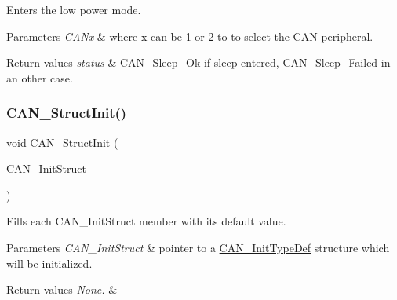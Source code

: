 Enters the low power mode. 


\begin{DoxyParams}{Parameters}
{\em C\+A\+Nx} & where x can be 1 or 2 to to select the C\+AN peripheral. \\
\hline
\end{DoxyParams}

\begin{DoxyRetVals}{Return values}
{\em status} & C\+A\+N\+\_\+\+Sleep\+\_\+\+Ok if sleep entered, C\+A\+N\+\_\+\+Sleep\+\_\+\+Failed in an other case. \\
\hline
\end{DoxyRetVals}
\mbox{\label{group___c_a_n___private___functions_gad77ad810868ed111755fc9e8ae0c7646}} 
\subsubsection{\texorpdfstring{CAN\_StructInit()}{CAN\_StructInit()}}
{\footnotesize\ttfamily void C\+A\+N\+\_\+\+Struct\+Init (\begin{DoxyParamCaption}\item[{\mbox{\hyperlink{struct_c_a_n___init_type_def}{C\+A\+N\+\_\+\+Init\+Type\+Def}} $\ast$}]{C\+A\+N\+\_\+\+Init\+Struct }\end{DoxyParamCaption})}



Fills each C\+A\+N\+\_\+\+Init\+Struct member with its default value. 


\begin{DoxyParams}{Parameters}
{\em C\+A\+N\+\_\+\+Init\+Struct} & pointer to a \mbox{\hyperlink{struct_c_a_n___init_type_def}{C\+A\+N\+\_\+\+Init\+Type\+Def}} structure which will be initialized. \\
\hline
\end{DoxyParams}

\begin{DoxyRetVals}{Return values}
{\em None.} & \\
\hline
\end{DoxyRetVals}
\mbox{\label{group___c_a_n___private___functions_gaccfcb81f76f58400077c7b2d8641dd83}} 
